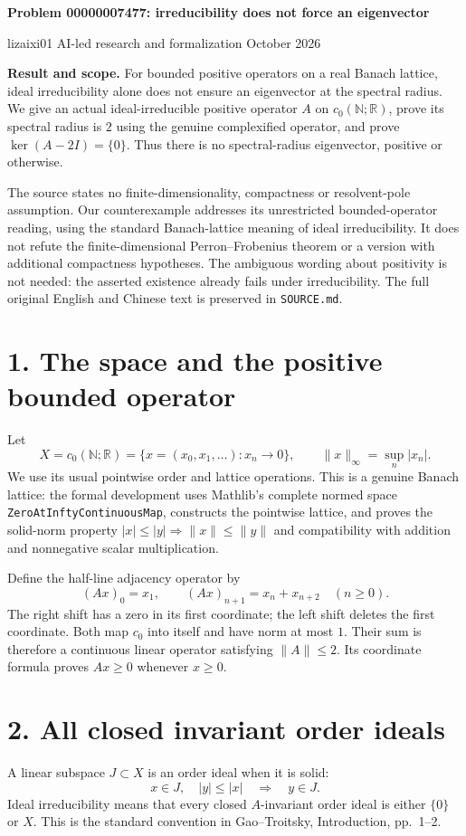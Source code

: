 \documentclass[10pt]{article}
\newcommand{\R}{\mathbb R}\newcommand{\C}{\mathbb C}
\begin{document}
\begin{center}
{\Large\bfseries Problem 00000007477: irreducibility does not force an eigenvector}

lizaixi01 \quad AI-led research and formalization  October 2026
\end{center}
\textbf{Result and scope.}
For bounded positive operators on a real Banach lattice, ideal irreducibility alone does not ensure an eigenvector at the spectral radius. We give an actual ideal-irreducible positive operator $A$ on $c_0(\mathbb N;\R)$, prove its spectral radius is $2$ using the genuine complexified operator, and prove $\ker(A-2I)=\{0\}$. Thus there is no spectral-radius eigenvector, positive or otherwise.

The source states no finite-dimensionality, compactness or resolvent-pole assumption. Our counterexample addresses its unrestricted bounded-operator reading, using the standard Banach-lattice meaning of ideal irreducibility. It does not refute the finite-dimensional Perron--Frobenius theorem or a version with additional compactness hypotheses. The ambiguous wording about positivity is not needed: the asserted existence already fails under irreducibility. The full original English and Chinese text is preserved in \texttt{SOURCE.md}.

\section*{1. The space and the positive bounded operator}
Let
\[
X=c_0(\mathbb N;\R)=\{x=(x_0,x_1,\ldots):x_n\longrightarrow0\},
\qquad \|x\|_\infty=\sup_n|x_n|.
\]
We use its usual pointwise order and lattice operations. This is a genuine Banach lattice: the formal development uses Mathlib's complete normed space \texttt{ZeroAtInftyContinuousMap}, constructs the pointwise lattice, and proves the solid-norm property $|x|\le|y|\Rightarrow\|x\|\le\|y\|$ and compatibility with addition and nonnegative scalar multiplication.

Define the half-line adjacency operator by
\[
(Ax)_0=x_1,\qquad (Ax)_{n+1}=x_n+x_{n+2}\quad(n\ge0).
\]
The right shift has a zero in its first coordinate; the left shift deletes the first coordinate. Both map $c_0$ into itself and have norm at most $1$. Their sum is therefore a continuous linear operator satisfying $\|A\|\le2$. Its coordinate formula proves $Ax\ge0$ whenever $x\ge0$.

\section*{2. All closed invariant order ideals}
A linear subspace $J\subset X$ is an order ideal when it is solid:
\[
x\in J,\quad |y|\le|x|\quad\Longrightarrow\quad y\in J.
\]
Ideal irreducibility means that every closed $A$-invariant order ideal is either $\{0\}$ or $X$. This is the standard convention in Gao--Troitsky, Introduction, pp.\ 1--2.
\end{document}
